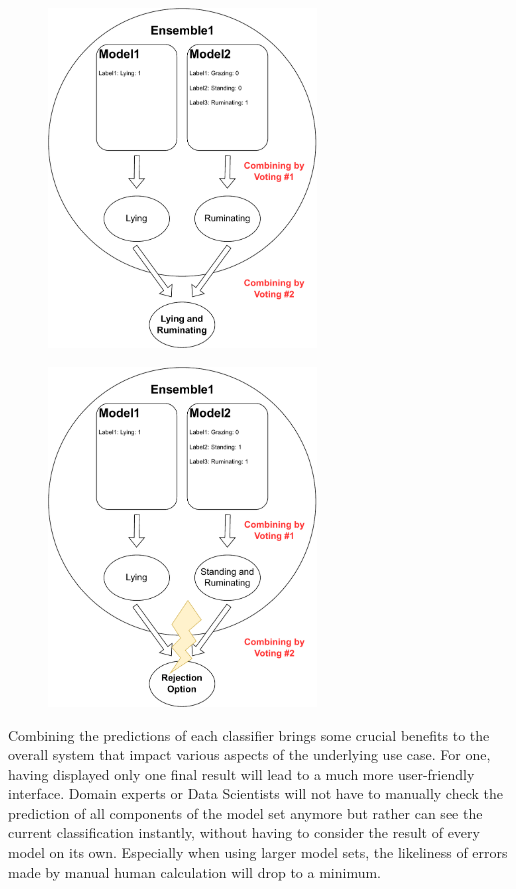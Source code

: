   \begin{figure}
    \centering
    \begin{minipage}{.5\textwidth}
      \centering
      \includegraphics[height=9cm]{graphics/combining.pdf}
      \label{fig:combining}
    \end{minipage}%
    \begin{minipage}{.5\textwidth}
      \centering
      \includegraphics[height=9cm]{graphics/combiningrejection.pdf}
      \label{fig:combiningrejection}
    \end{minipage}
    \end{figure}


Combining the predictions of each classifier brings some crucial benefits to the overall system that impact various aspects of the underlying use case. For one, having displayed only one final result will lead to a much more user-friendly interface. Domain experts or Data Scientists will not have to manually check the prediction of all components of the model set anymore but rather can see the current classification instantly, without having to consider the result of every model on its own. Especially when using larger model sets, the likeliness of errors made by manual human calculation will drop to a minimum. 


